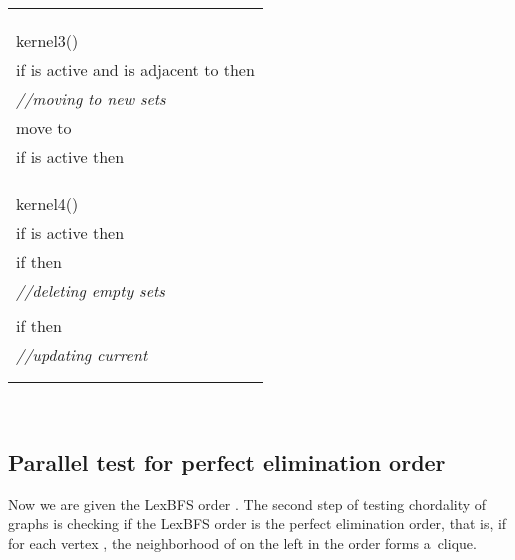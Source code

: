 \documentclass[a4paper, 11pt]{article}
\begin{document}
\begin{tabular}{l}
\hspace{1cm}        \\
\hspace{1cm}        \\
\\
kernel3()\\
\hspace{0.5cm} if  is active and  is adjacent to  then\\
\hspace{1cm}        \textit{//moving to new sets}\\ 
\hspace{1cm}        move  to \\
\hspace{0.5cm} if  is active then\\
\hspace{1cm}        \\
\hspace{1cm}        \\
\\
kernel4()\\
\hspace{0.5cm}  if  is active then\\
\hspace{1cm}        if  then\\
\hspace{1.5cm}          \textit{//deleting empty sets}\\
\hspace{1.5cm}          \\
\hspace{1cm}        if  then\\
\hspace{1.5cm}          \textit{//updating current}\\
\hspace{1.5cm}          \\
\\

\hline

\end{tabular}\\

\newpage

\subsection{Parallel test for perfect elimination order}

Now we are given the LexBFS order . The second step of testing chordality of graphs 
is checking if the LexBFS order is the perfect elimination order, that is, if for each 
vertex , the neighborhood of  on the left in the order forms a~clique. 
\end{document}
